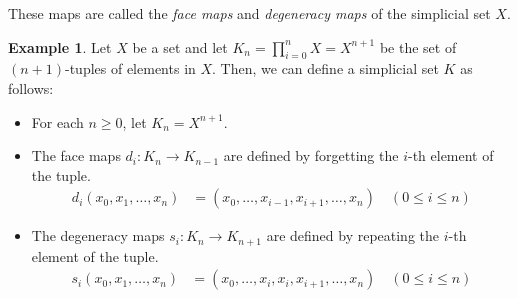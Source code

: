 \documentclass[11pt]{article}
\theoremstyle{definition}
\newtheorem{example}[definition]{Example}
\theoremstyle{plain}
\begin{document}
These maps are called the \emph{face maps} and \emph{degeneracy maps} of the simplicial set $X$.
\begin{example}
    Let $X$ be a set and let $K_n =\prod_{i=0}^n X=X^{n+1}$ be the set of $(n+1)$-tuples of elements in $X$. Then, we can define a simplicial set $K$ as follows:
    \begin{itemize}
        \item For each $n \geq 0$, let $K_n = X^{n+1}$.
        \item The face maps $d_i : K_n \to K_{n-1}$ are defined by forgetting the $i$-th element of the tuple.
              \begin{align*}
                  d_i(x_0, x_1, \ldots, x_n) & = (x_0, \ldots, x_{i-1}, x_{i+1}, \ldots, x_n) \quad (0 \leq i \leq n)
              \end{align*}
        \item The degeneracy maps $s_i : K_n \to K_{n+1}$ are defined by repeating the $i$-th element of the tuple.
              \begin{align*}
                  s_i(x_0, x_1, \ldots, x_n) & = (x_0, \ldots, x_i, x_i, x_{i+1}, \ldots, x_n) \quad (0 \leq i \leq n)
              \end{align*}
    \end{itemize}

\end{example}
\end{document}
